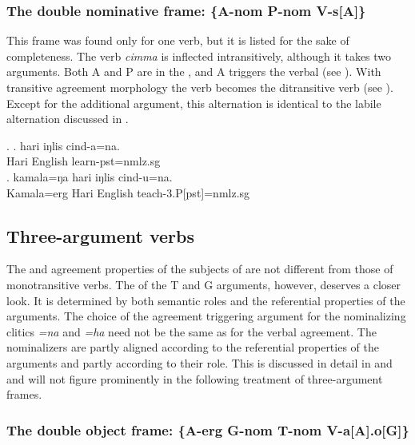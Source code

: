 \subsubsection[The double nominative frame]{The double nominative frame: \{A-{\sc nom} P-{\sc nom} V-s[A]\}}\label{itr-teach}


\noindent
This frame was found only for one verb, but it is listed for the sake of completeness. The verb \emph{cimma}  is inflected intransitively, although it takes two arguments. Both A and P are in the , and  A triggers the verbal  (see  \Next[a]). With transitive agreement morphology the verb becomes the ditransitive verb  (see \Next[b]). Except for the additional argument, this alternation is identical to the labile alternation discussed in . 

\ex. \ag. hari iŋlis cind-a=na.\\
		Hari English learn{\sc [3sg]-pst=nmlz.sg}	\\
 	\bg. kamala=ŋa hari iŋlis cind-u=na.\\
	Kamala{\sc =erg} Hari English teach{\sc -3.P[pst]=nmlz.sg}		\\

\subsection[]{Three-argument verbs}\label{three-arg-frame}

The  and agreement properties of the subjects of  are not different from those of monotransitive verbs. The  of the T and G arguments, however, deserves a closer look. It is determined  by both semantic roles and the referential properties of the arguments.  The choice of the agreement triggering argument for the nominalizing clitics \emph{=na} and \emph{=ha} need not be the same as for the verbal agreement. The nominalizers are partly aligned according to the referential properties of the arguments and partly according to their role. This is discussed in detail in  and  and will not figure prominently in the following treatment of three-argument frames.
 
\subsubsection[The double object frame]{The double object frame: \{A-{\sc erg} G-{\sc nom} T-{\sc nom}  V-a[A].o[G]\}}

